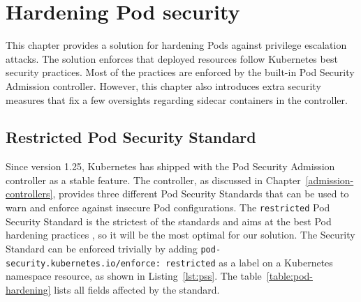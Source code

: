 \documentclass[english, 12pt, a4paper, sci, utf8, a-2b, online]{aaltothesis}
\begin{document}
\clearpage

\section{Hardening Pod security} \label{sec:pod-hardening}

This chapter provides a solution for hardening Pods against privilege escalation attacks.
The solution enforces that deployed resources follow Kubernetes best security practices.
Most of the practices are enforced by the built-in Pod Security Admission controller.
However, this chapter also introduces extra security measures that fix a few oversights regarding sidecar containers in the controller.


\subsection{Restricted Pod Security Standard}

Since version 1.25, Kubernetes has shipped with the Pod Security Admission controller as a stable feature.
The controller, as discussed in Chapter~\ref{admission-controllers}, provides three different Pod Security Standards that can be used to warn and enforce against insecure Pod configurations.
The \texttt{restricted} Pod Security Standard is the strictest of the standards and aims at the best Pod hardening practices \cite{k8s-docs-pss}, so it will be the most optimal for our solution.
The Security Standard can be enforced trivially by adding \texttt{pod-security.kubernetes.io/enforce: restricted} as a label on a Kubernetes namespace resource, as shown in Listing~\ref{lst:pss}.
The table~\ref{table:pod-hardening} lists all fields affected by the standard.


\end{document}
